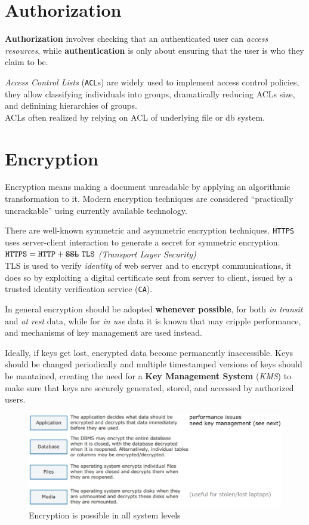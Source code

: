 \section{Authorization}
\label{sec:authorization}
\textbf{Authorization} involves checking that an authenticated user can \textit{access resources},
while \textbf{authentication} is only about ensuring that the user is who they claim to be.

\textit{Access Control Lists} (\texttt{ACL}s) are widely used to implement access control policies,
they allow
classifying individuals into groups, dramatically reducing ACLs size,
and definining hierarchies of groups.\\
ACLs often realized by relying on ACL of underlying file or db
system.

\section{Encryption}

Encryption means making a document unreadable by applying an algorithmic transformation to it.
Modern encryption techniques are considered “practically uncrackable”
using currently available technology.

There are well-known symmetric and asymmetric encryption techniques.
\texttt{HTTPS} uses server-client interaction to generate a secret for symmetric encryption.\\
$\texttt{HTTPS} = \texttt{HTTP} + \st{\texttt{SSL}}\ \texttt{TLS}$ \textit{(Transport Layer Security)}\\
TLS is used to verify \textit{identity} of web server and to encrypt communications,
it does so by exploiting a digital certificate sent from server to client, issued by a trusted identity verification service (\texttt{CA}).

In general encryption should be adopted \textbf{whenever possible},
for both \textit{in transit} and \textit{at rest} data,
while for \textit{in use} data it is known that may cripple performance, 
and mechanisms of key management are used instead.

Ideally, if keys get lost, encrypted data become permanently inaccessible.
Keys should be changed periodically and multiple timestamped versions of keys should be mantained,
creating the need for a \textbf{Key Management System}
(\textit{KMS}) to make sure that keys are securely generated, stored, and accessed by authorized users.

\begin{figure}[htbp]
   \centering
   \includegraphics{images/encryption.png}
   \caption{Encryption is possible in all system levels}
   \label{fig:encryption}
\end{figure}


